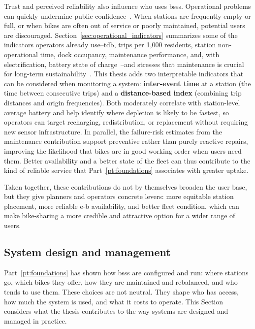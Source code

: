 Trust and perceived reliability also influence who uses \acp{bss}. Operational problems can quickly undermine public confidence~\cite{Yle2015_HelsinkiBikeShare}. When stations are frequently empty or full, or when bikes are often out of service or poorly maintained, potential users are discouraged. Section~\ref{sec:operational_indicators} summarizes some of the indicators operators already use--\ac{tdb}, trips per 1,000 residents, station non-operational time, dock occupancy, maintenance performance, and, with electrification, battery state of charge~\cite{Waldner2025, Yanocha2018}--and stresses that maintenance is crucial for long-term sustainability~\cite{Rossow2018, Santander2022}. This thesis adds two interpretable indicators that can be considered when monitoring a system: \textbf{inter-event time} at a station (the time between consecutive trips) and a \textbf{distance-based index} (combining trip distances and origin frequencies). Both moderately correlate with station-level average battery and help identify where depletion is likely to be fastest, so operators can target recharging, redistribution, or replacement without requiring new sensor infrastructure. In parallel, the failure-risk estimates from the maintenance contribution support preventive rather than purely reactive repairs, improving the likelihood that bikes are in good working order when users need them. Better availability and a better state of the fleet can thus contribute to the kind of reliable service that Part~\ref{pt:foundations} associates with greater uptake.

Taken together, these contributions do not by themselves broaden the user base, but they give planners and operators concrete levers: more equitable station placement, more reliable \ac{e-b} availability, and better fleet condition, which can make bike-sharing a more credible and attractive option for a wider range of users.


\subsection{System design and management}

Part~\ref{pt:foundations} has shown how \acp{bss} are configured and run: where stations go, which bikes they offer, how they are maintained and rebalanced, and who tends to use them. These choices are not neutral. They shape who has access, how much the system is used, and what it costs to operate. This Section considers what the thesis contributes to the way systems are designed and managed in practice.

